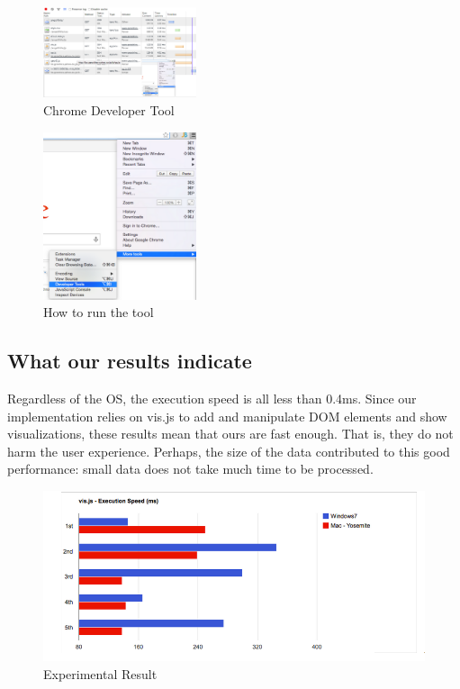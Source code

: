 \documentclass[a4paper]{article}
\begin{document}
\begin{figure}
\centering
\includegraphics[width=0.4\textwidth]{1.png}
\caption{\label{fig:1}Chrome Developer Tool}
\end{figure}

\begin{figure}
\centering
\includegraphics[width=0.4\textwidth]{2.png}
\caption{\label{fig:2}How to run the tool}
\end{figure}


\subsection{What our results indicate}
Regardless of the OS, the execution speed is all less than 0.4ms. Since our implementation relies on vis.js to add and manipulate DOM elements and show visualizations, these results mean that ours are fast enough. That is, they do not harm the user experience. Perhaps, the size of the data contributed to this good performance: small data does not take much time to be processed. 
\begin{figure}
\centering
\includegraphics[width=1.0\textwidth]{3.png}
\caption{\label{fig:3}Experimental Result}
\end{figure}
\end{document}
